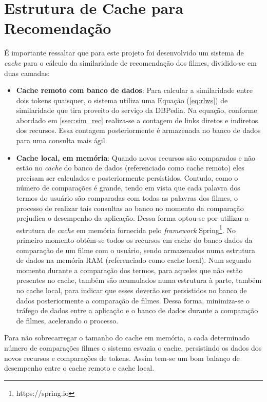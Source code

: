 \section{Estrutura de Cache para Recomendação}
\label{sec:cache}

É importante ressaltar que para este projeto foi desenvolvido um sistema de \textit{cache} para o cálculo da similaridade de recomendação dos filmes, dividido-se em duas camadas:

\begin{itemize}
	\item{\textbf{Cache remoto com banco de dados}: Para calcular a similaridade entre dois tokens quaisquer, o sistema utiliza uma Equação (\ref{eq:rlws}) de similaridade que tira proveito do serviço da DBPedia. Na equação, conforme abordado em \ref{ssec:sim_rec} realiza-se a contagem de links diretos e indiretos dos recursos. Essa contagem posteriormente é armazenada no banco de dados para uma consulta mais ágil.}
	\item{\textbf{Cache local, em memória}: Quando novos recursos são comparados e não estão no \textit{cache} do banco de dados (referenciado como cache remoto) eles precisam ser calculados e posteriormente persistidos. Contudo, como o número de comparações é grande, tendo em vista que cada palavra dos termos do usuário são comparadas com todas as palavras dos filmes, o processo de realizar tais consultas ao banco no momento da comparação prejudica o desempenho da aplicação. Dessa forma optou-se por utilizar a estrutura de \textit{cache} em memória fornecida pelo \textit{framework} Spring\footnote{https://spring.io}. No primeiro momento obtém-se todos os recursos em cache do banco dados da comparação de um filme com o usuário, sendo armazenados numa estrutura de dados na memória \ac{RAM} (referenciado como cache local). Num segundo momento durante a comparação dos termos, para aqueles que não estão presentes no cache, também são acumulados numa estrutura à parte, também no cache local, para indicar que esses deverão ser persistidos no banco de dados posteriormente a comparação de filmes. Dessa forma, minimiza-se o tráfego de dados entre a aplicação e o banco de dados durante a comparação de filmes, acelerando o processo.}
\end{itemize}
	
Para não sobrecarregar o tamanho do cache em memória, a cada determinado número de comparações filmes o sistema esvazia o cache, persistindo os dados dos novos recursos e comparações de tokens. Assim tem-se um bom balanço de desempenho entre o cache remoto e cache local.


